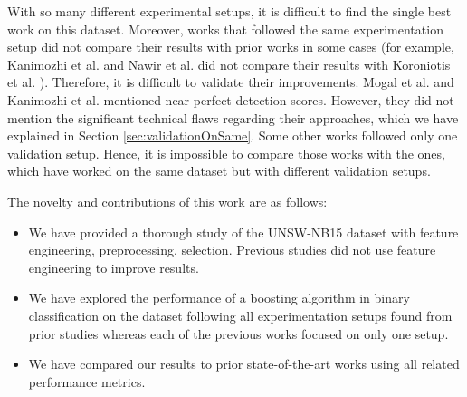 \documentclass[14pt, conference]{IEEEtran}
\begin{document}

With so many different experimental setups, it is difficult to find the single best work on this dataset. Moreover, works that followed the same experimentation setup did not compare their results with prior works in some cases (for example, Kanimozhi et al. \cite{Kanimozhi2019UNSW-NB15} and Nawir et al. \cite{nawir2019effective} did not compare their results with  Koroniotis et al. \cite{koroniotis2017towards}). Therefore, it is difficult to validate their improvements. Mogal et al. \cite{mogal2017nids} and Kanimozhi et al. \cite{Kanimozhi2019UNSW-NB15} mentioned near-perfect detection scores. However, they did not mention the significant technical flaws regarding their approaches, which we have explained in Section \ref{sec:validationOnSame}.  Some other works \cite{nawir2019effective, Kanimozhi2019UNSW-NB15, meghdouri2018analysis} followed only one validation setup. Hence, it is impossible to compare those works with the ones, which have worked on the same dataset but with different validation setups.

The novelty and contributions of this work are as follows:
\begin{itemize}
    \item We have provided a thorough study of the UNSW-NB15 dataset with feature engineering, preprocessing, selection. Previous studies did not use feature engineering to improve results.
    \item We have explored the performance of a boosting algorithm in binary classification on the dataset following all experimentation setups found from prior studies whereas each of the previous works focused on only one setup.
    \item We have compared our results to prior state-of-the-art works using all related performance metrics.
\end{itemize}
\end{document}
